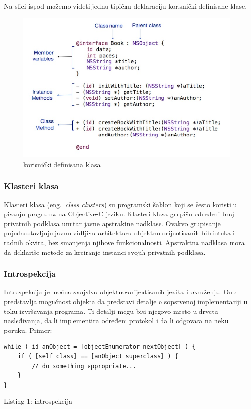 \documentclass[a4paper]{article}
\begin{document}
{Na slici ispod možemo videti jednu tipičnu deklaraciju korisnički definisane klase.
\begin{figure}[h!]
	\begin{center}
	\includegraphics[scale=0.6]{bruKt.jpg}
	\caption{korisnički definisana klasa}	
	\label{fig:bruKt}
	\end{center}
\end{figure}

\subsubsection{Klasteri klasa}
Klasteri klasa (eng.~{\em class clusters}) su programski šablon koji se često koristi u pisanju programa na Objective-C jeziku. Klasteri klasa grupišu određeni broj privatnih podklasa unutar javne apstraktne nadklase. 
Ovakvo grupisanje pojednostavljuje javno vidljivu arhitekturu objektno-orijentisanih biblioteka i radnih okvira, bez smanjenja njihove funkcionalnosti. Apstraktna nadklasa mora da deklariše metode za kreiranje instanci svojih privatnih podklasa. 
\subsubsection{Introspekcija}
Introspekcija je moćno svojstvo objektno-orijentisanih jezika i okruženja. Ono predstavlja mogućnost objekta da predstavi detalje o sopstvenoj implementaciji u toku izvršavanja programa. Ti detalji mogu biti njegovo mesto u drvetu nasleđivanja, da li implementira određeni protokol i da li odgovara na neku poruku. Primer: 
\begin{lstlisting}[frame=single]
while ( id anObject = [objectEnumerator nextObject] ) {
    if ( [self class] == [anObject superclass] ) {
        // do something appropriate...
    }
}
\end{lstlisting} 
\caption{Listing 1: introspekcija} \\

}
\end{document}
